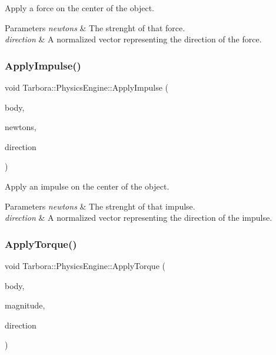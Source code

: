 Apply a force on the center of the object. 


\begin{DoxyParams}{Parameters}
{\em newtons} & The strenght of that force. \\
\hline
{\em direction} & A normalized vector representing the direction of the force. \\
\hline
\end{DoxyParams}
\mbox{\label{classTarbora_1_1PhysicsEngine_a3d5343fcdd079664377637ff9188595e}} 
\subsubsection{\texorpdfstring{Apply\+Impulse()}{ApplyImpulse()}}
{\footnotesize\ttfamily void Tarbora\+::\+Physics\+Engine\+::\+Apply\+Impulse (\begin{DoxyParamCaption}\item[{bt\+Rigid\+Body $\ast$}]{body,  }\item[{float}]{newtons,  }\item[{const glm\+::vec3 \&}]{direction }\end{DoxyParamCaption})\hspace{0.3cm}{\ttfamily [static]}}



Apply an impulse on the center of the object. 


\begin{DoxyParams}{Parameters}
{\em newtons} & The strenght of that impulse. \\
\hline
{\em direction} & A normalized vector representing the direction of the impulse. \\
\hline
\end{DoxyParams}
\mbox{\label{classTarbora_1_1PhysicsEngine_a7bfaabd962f0825536195708d4442a3d}} 
\subsubsection{\texorpdfstring{Apply\+Torque()}{ApplyTorque()}}
{\footnotesize\ttfamily void Tarbora\+::\+Physics\+Engine\+::\+Apply\+Torque (\begin{DoxyParamCaption}\item[{bt\+Rigid\+Body $\ast$}]{body,  }\item[{float}]{magnitude,  }\item[{const glm\+::vec3 \&}]{direction }\end{DoxyParamCaption})\hspace{0.3cm}{\ttfamily [static]}}



